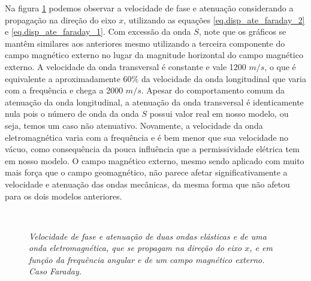 Na figura \ref{fig.disp_fa_x_dir} podemos observar a velocidade de fase e atenua\c{c}\~ao considerando a propaga\c{c}\~ao na dire\c{c}\~ao do eixo $x$, utilizando as equa\c{c}\~oes \ref{eq.disp_ate_faraday_2}
 e \ref{eq.disp_ate_faraday_1}. Com excess\~ao da onda $S$, note que os gr\'aficos se mant\^em similares aos anteriores mesmo utilizando a terceira componente do campo magn\'etico externo no lugar da magnitude horizontal do campo magn\'etico externo. A velocidade da onda transversal \'e constante e vale 1200 $m/s$, o que \'e equivalente a aproximadamente $60\%$ da velocidade da onda longitudinal que varia com a frequ\^encia e chega a 2000 $m/s$. Apesar do comportamento comum da atenua\c{c}\~ao da onda longitudinal, a atenua\c{c}\~ao da onda transversal \'e identicamente nula pois o n\'umero de onda da onda $S$  possui valor real em nosso modelo, ou seja, temos um caso n\~ao atenuativo. Novamente, a velocidade da onda eletromagn\'etica varia com a frequ\^encia e \'e bem menor que sua velocidade no v\'acuo, como consequ\^encia da pouca influ\^encia que a permissividade el\'etrica tem em nosso modelo. O campo magn\'etico externo, mesmo sendo aplicado com muito mais for\c{c}a que o campo geomagn\'etico, n\~ao parece afetar significativamente a velocidade e atenua\c{c}\~ao das ondas mec\^anicas, da mesma forma que n\~ao afetou para os dois modelos anteriores.
 
\begin{figure}
\centering
{}
\\
\caption{\textit{Velocidade de fase e atenua\c{c}\~ao de duas ondas el\'asticas e de uma onda eletromagn\'etica, que se propagam na dire\c{c}\~ao do eixo $x$, e em fun\c{c}\~ao da frequ\^encia angular e de um campo magn\'etico externo. Caso Faraday.}}
\label{fig.disp_fa_x_dir}
\end{figure}

